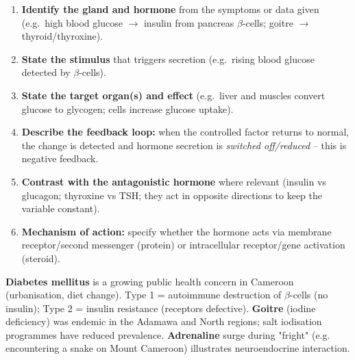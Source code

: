 \documentclass[11pt]{article}
\begin{document}
\begin{methode}
\begin{enumerate}
\item \textbf{Identify the gland and hormone} from the symptoms or data given (e.g.\ high blood glucose $\rightarrow$ insulin from pancreas $\beta$-cells; goitre $\rightarrow$ thyroid/thyroxine).
\item \textbf{State the stimulus} that triggers secretion (e.g.\ rising blood glucose detected by $\beta$-cells).
\item \textbf{State the target organ(s) and effect} (e.g.\ liver and muscles convert glucose to glycogen; cells increase glucose uptake).
\item \textbf{Describe the feedback loop:} when the controlled factor returns to normal, the change is detected and hormone secretion is \emph{switched off/reduced} -- this is negative feedback.
\item \textbf{Contrast with the antagonistic hormone} where relevant (insulin vs glucagon; thyroxine vs TSH; they act in opposite directions to keep the variable constant).
\item \textbf{Mechanism of action:} specify whether the hormone acts via membrane receptor/second messenger (protein) or intracellular receptor/gene activation (steroid).
\end{enumerate}
\end{methode}

\begin{savaistu}
\textbf{Diabetes mellitus} is a growing public health concern in Cameroon (urbanisation, diet change). Type 1 = autoimmune destruction of $\beta$-cells (no insulin); Type 2 = insulin resistance (receptors defective). \textbf{Goitre} (iodine deficiency) was endemic in the Adamawa and North regions; salt iodisation programmes have reduced prevalence. \textbf{Adrenaline} surge during "fright" (e.g. encountering a snake on Mount Cameroon) illustrates neuroendocrine interaction.
\end{savaistu}
\end{document}
